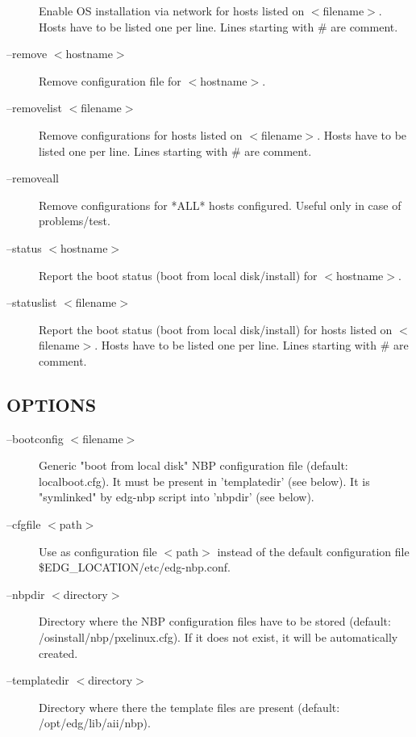\begin{description}
Enable OS installation via network for hosts listed on $<$filename$>$.
Hosts have to be listed one per line. Lines starting with \# are comment.


\item[--remove $<$hostname$>$] \mbox{}

Remove configuration file for $<$hostname$>$.


\item[--removelist $<$filename$>$] \mbox{}

Remove configurations for hosts listed on $<$filename$>$. Hosts have to
be listed one per line. Lines starting with \# are comment.


\item[--removeall] \mbox{}

Remove configurations for *ALL* hosts configured. Useful only in case
of problems/test.


\item[--status $<$hostname$>$] \mbox{}

Report the boot status (boot from local disk/install) for $<$hostname$>$.


\item[--statuslist $<$filename$>$] \mbox{}

Report the boot status (boot from local disk/install) for hosts listed
on $<$filename$>$. Hosts have to be listed one per line. Lines starting
with \# are comment.

\end{description}
\subsection*{OPTIONS\label{edg-nbp_OPTIONS}}
\begin{description}

\item[--bootconfig $<$filename$>$] \mbox{}

Generic "boot from local disk" NBP configuration file (default:
localboot.cfg). It must be present in 'templatedir' (see below).
It is "symlinked" by edg-nbp script into 'nbpdir' (see below).


\item[--cfgfile $<$path$>$] \mbox{}

Use as configuration file $<$path$>$ instead of the default
configuration file \$EDG\_LOCATION/etc/edg-nbp.conf.


\item[--nbpdir $<$directory$>$] \mbox{}

Directory where the NBP configuration files have to be stored
(default: /osinstall/nbp/pxelinux.cfg). If it does not exist, it will
be automatically created.


\item[--templatedir $<$directory$>$] \mbox{}

Directory where there the template files are present
(default: /opt/edg/lib/aii/nbp).

\end{description}
